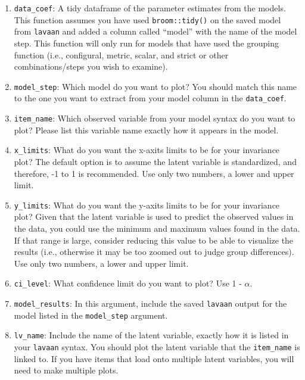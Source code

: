 \documentclass[
  man]{apa6}
\begin{document}
\begin{enumerate}
\def\labelenumi{\arabic{enumi})}
\item
  \texttt{data\_coef}: A tidy dataframe of the parameter estimates from the models. This function assumes you have used \texttt{broom::tidy()} on the saved model from \texttt{lavaan} and added a column called ``model'' with the name of the model step. This function will only run for models that have used the grouping function (i.e., configural, metric, scalar, and strict or other combinations/steps you wish to examine).
\item
  \texttt{model\_step}: Which model do you want to plot? You should match this name to the one you want to extract from your model column in the \texttt{data\_coef}.
\item
  \texttt{item\_name}: Which observed variable from your model syntax do you want to plot? Please list this variable name exactly how it appears in the model.
\item
  \texttt{x\_limits}: What do you want the x-axits limits to be for your invariance plot? The default option is to assume the latent variable is standardized, and therefore, -1 to 1 is recommended. Use only two numbers, a lower and upper limit.
\item
  \texttt{y\_limits}: What do you want the y-axits limits to be for your invariance plot? Given that the latent variable is used to predict the observed values in the data, you could use the minimum and maximum values found in the data. If that range is large, consider reducing this value to be able to visualize the results (i.e., otherwise it may be too zoomed out to judge group differences). Use only two numbers, a lower and upper limit.
\item
  \texttt{ci\_level}: What confidence limit do you want to plot? Use 1 - \(\alpha\).
\item
  \texttt{model\_results}: In this argument, include the saved \texttt{lavaan} output for the model listed in the \texttt{model\_step} argument.
\item
  \texttt{lv\_name}: Include the name of the latent variable, exactly how it is listed in your \texttt{lavaan} syntax. You should plot the latent variable that the \texttt{item\_name} is linked to. If you have items that load onto multiple latent variables, you will need to make multiple plots.
\end{enumerate}

\small
\end{document}
